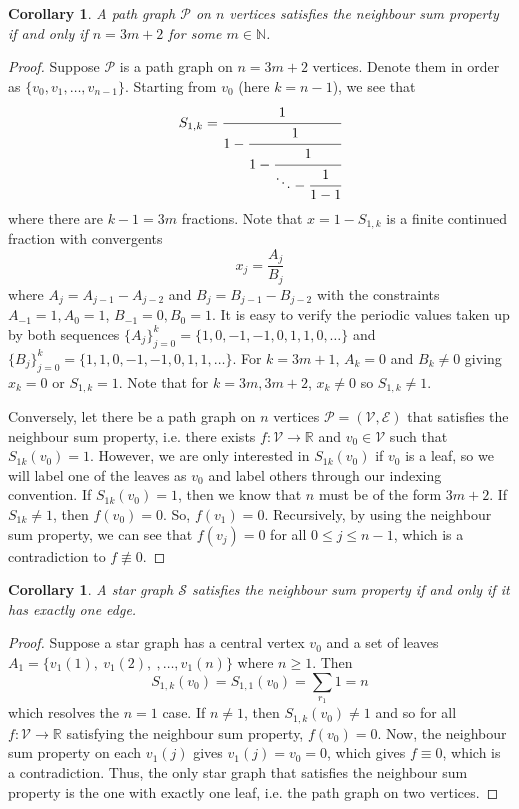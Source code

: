 \documentclass[11pt]{article}
\newtheorem{cor}[nummer]{Corollary}
\begin{document}
\begin{cor}\label{path}
    A path graph $\mathcal{P}$ on $n$ vertices satisfies the neighbour sum property if and only if $n = 3m+2$ for some $m\in \mathbb N$.
\end{cor}
\begin{proof}
    Suppose $\mathcal{P}$ is a path graph on $n=3m+2$ vertices. Denote them in order as $\{v_0, v_1, \ldots, v_{n-1}\}$. Starting from $v_0$ (here $k=n-1$), we see that
    $$S_{1,k}=\cfrac{1}{1 -\cfrac{1}{1 -\cfrac{1}{\ddots -\cfrac{1}{1-1}}}}$$
    where there are $k-1=3m$ fractions. Note that $x=1-S_{1,k}$ is a finite continued fraction with convergents $$x_j=\dfrac{A_j}{B_j}$$ where $A_j=A_{j-1}-A_{j-2}$ and $B_j=B_{j-1}-B_{j-2}$ with the constraints $A_{-1}=1, A_0=1$, $B_{-1}=0, B_0=1$. It is easy to verify the periodic values taken up by both sequences $\{A_j\}_{j=0}^{k} = \{1,0,-1,-1,0,1,1,0,\ldots\}$ and $\{B_j\}_{j=0}^{k} = \{1,1,0,-1,-1,0,1,1,\ldots\}$. For $k=3m+1$, $A_k=0$ and $B_k\neq 0$ giving $x_k=0$ or $S_{1,k}=1$. Note that for $k=3m, 3m+2$, $x_k\neq 0$ so $S_{1,k}\neq 1$.

    Conversely, let there be a path graph on $n$ vertices $\mathcal{P}=(\mathcal{V}, \mathcal{E})$ that satisfies the neighbour sum property, i.e. there exists $f:\mathcal{V}\to\mathbb R$ and $v_0\in\mathcal V$ such that $S_{1k}(v_0)=1$. However, we are only interested in $S_{1k}(v_0)$ if $v_0$ is a leaf, so we will label one of the leaves as $v_0$ and label others through our indexing convention. If $S_{1k}(v_0)=1$, then we know that $n$ must be of the form $3m+2$. If $S_{1k}\neq 1$, then $f(v_0)=0$. So, $f(v_1)=0$. Recursively, by using the neighbour sum property, we can see that $f(v_j)=0$ for all $0\leq j\leq n-1$, which is a contradiction to $f\not\equiv 0$.
\end{proof}

\begin{cor}\label{star}
    A star graph $\mathcal S$ satisfies the neighbour sum property if and only if it has exactly one edge.
\end{cor}
\begin{proof}
    Suppose a star graph has a central vertex $v_0$ and a set of leaves $A_1 = \{v_1(1),\:v_1(2),\:,\ldots,v_1(n)\}$ where $n\geq 1$. Then
    $$S_{1,k}(v_0) = S_{1,1}(v_0)=\sum_{r_1}1 = n$$
    which resolves the $n=1$ case. If $n\neq 1$, then $S_{1,k}(v_0)\neq 1$ and so for all $f:\mathcal{V}\to\mathbb{R}$ satisfying the neighbour sum property, $f(v_0)=0$.
    Now, the neighbour sum property on each $v_1(j)$ gives $v_1(j)=v_0=0$, which gives $f\equiv 0$, which is a contradiction. Thus, the only star graph that satisfies the neighbour sum property is the one with exactly one leaf, i.e. the path graph on two vertices.
\end{proof}
\end{document}
